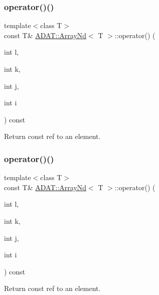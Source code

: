 \subsubsection{\texorpdfstring{operator()()}{operator()()}\hspace{0.1cm}{\footnotesize\ttfamily [23/24]}}
{\footnotesize\ttfamily template$<$class T$>$ \\
const T\& \mbox{\hyperlink{classADAT_1_1ArrayNd}{A\+D\+A\+T\+::\+Array\+Nd}}$<$ T $>$\+::operator() (\begin{DoxyParamCaption}\item[{int}]{l,  }\item[{int}]{k,  }\item[{int}]{j,  }\item[{int}]{i }\end{DoxyParamCaption}) const\hspace{0.3cm}{\ttfamily [inline]}}



Return const ref to an element. 

\mbox{\label{classADAT_1_1ArrayNd_aa2f8e4f6fa9a05745538791ba4f70aff}} 
\subsubsection{\texorpdfstring{operator()()}{operator()()}\hspace{0.1cm}{\footnotesize\ttfamily [24/24]}}
{\footnotesize\ttfamily template$<$class T$>$ \\
const T\& \mbox{\hyperlink{classADAT_1_1ArrayNd}{A\+D\+A\+T\+::\+Array\+Nd}}$<$ T $>$\+::operator() (\begin{DoxyParamCaption}\item[{int}]{l,  }\item[{int}]{k,  }\item[{int}]{j,  }\item[{int}]{i }\end{DoxyParamCaption}) const\hspace{0.3cm}{\ttfamily [inline]}}



Return const ref to an element. 

\mbox{\label{classADAT_1_1ArrayNd_ae3c6bdf408c630fc44a7c6dcdac94ae1}} 
